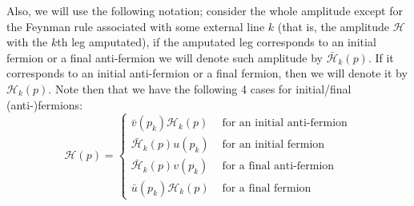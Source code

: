 \documentclass{article}
\begin{document}
Also, we will use the following notation;
consider the whole amplitude except for the Feynman rule
associated with some external line $k$
(that is, the amplitude $\mathcal{H}$ with the $k$th leg amputated),
if the amputated leg corresponds to an initial fermion or a final anti-fermion
we will denote such amplitude by $\bar{\mathcal{H}}_k(p)$.
If it corresponds to an initial anti-fermion or a final fermion,
then we will denote it by $\mathcal{H}_k(p)$.
Note then that we have the following 4 cases for initial/final (anti-)fermions:
\begin{equation}\label{eq:Hard_amplitude_definition}
	\mathcal{H}(p)
	= \begin{cases}
		\bar{v}(p_k)\mathcal{H}_k(p) & \text{ for an initial anti-fermion}\\
		\bar{\mathcal{H}}_k(p)u(p_k) & \text{ for an initial fermion}\\
		\bar{\mathcal{H}}_k(p)v(p_k) & \text{ for a final anti-fermion}\\
		\bar{u}(p_k)\mathcal{H}_k(p) & \text{ for a final fermion}
	\end{cases}
\end{equation}
\end{document}
